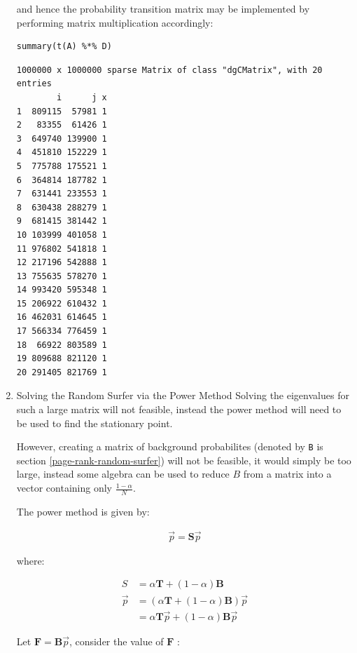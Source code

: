 \documentclass[11pt]{article}
\begin{document}
\begin{enumerate}
and hence the probability transition matrix may be implemented by performing matrix multiplication accordingly:

\lstset{language=r,label= ,caption= ,captionpos=b,numbers=none}
\begin{lstlisting}
summary(t(A) %*% D)
\end{lstlisting}

\begin{verbatim}
1000000 x 1000000 sparse Matrix of class "dgCMatrix", with 20 entries
        i      j x
1  809115  57981 1
2   83355  61426 1
3  649740 139900 1
4  451810 152229 1
5  775788 175521 1
6  364814 187782 1
7  631441 233553 1
8  630438 288279 1
9  681415 381442 1
10 103999 401058 1
11 976802 541818 1
12 217196 542888 1
13 755635 578270 1
14 993420 595348 1
15 206922 610432 1
16 462031 614645 1
17 566334 776459 1
18  66922 803589 1
19 809688 821120 1
20 291405 821769 1
\end{verbatim}

\item Solving the Random Surfer via the Power Method
\label{sec:org7231a39}
Solving the eigenvalues for such a large matrix will not feasible, instead the power method will need to be used to find the stationary point.

However, creating a matrix of background probabilites (denoted by \texttt{B} is section \ref{page-rank-random-surfer}) will not be feasible, it would simply be too large, instead some algebra can be used to reduce \(B\) from a matrix into a vector containing only \(\frac{1-\alpha}{N}\).

The power method is given by:

\begin{align}
\vec{p}= \mathbf{S} \vec{p}
\end{align}

where:

\begin{align}
S &= \alpha \mathbf{T} +  \left( 1 - \alpha \right) \mathbf{B} \\
\vec{p} &= \left( \alpha \mathbf{T} +  \left( 1 - \alpha \right) \mathbf{B} \right) \vec{p}\\
&= \alpha \mathbf{T}\vec{p} +  \left( 1-\alpha \right) \mathbf{B} \vec{p}
\end{align}

Let \(\mathbf{F}= \mathbf{B}\vec{p}\), consider the value of \(\mathbf{F}\) :


\end{enumerate}
\end{document}
